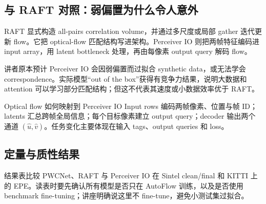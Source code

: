 
\subsection{与 RAFT 对照：弱偏置为什么令人意外}

RAFT 显式构造 all-pairs correlation volume，并通过多尺度或局部 gather 迭代更新 flow。它把 optical-flow 匹配结构写进架构。Perceiver IO 则把两帧特征编码进 input array，用 latent bottleneck 处理，再由每像素 output query 解码 flow。


讲者原本预计 Perceiver IO 会因弱偏置而过拟合 synthetic data，或无法学会 correspondence。实际模型“out of the box”获得有竞争力结果，说明大数据和 attention 可以学习部分匹配结构；但这不代表其速度或小数据效率优于 RAFT。



\begin{importantbox}{Optical flow 如何映射到 Perceiver IO}
Input rows 编码两帧像素、位置与帧 ID；latents 汇总跨帧全局信息；每个目标像素建立 output query；decoder 输出两个通道 $(\hat u,\hat v)$。任务变化主要体现在输入 tags、output queries 和 loss。
\end{importantbox}

\subsection{定量与质性结果}

结果表比较 PWCNet、RAFT 与 Perceiver IO 在 Sintel clean/final 和 KITTI 上的 EPE。读表时要先确认所有模型是否只在 AutoFlow 训练，以及是否使用 benchmark fine-tuning；讲座明确说这里不 fine-tune，避免小测试集过拟合。


